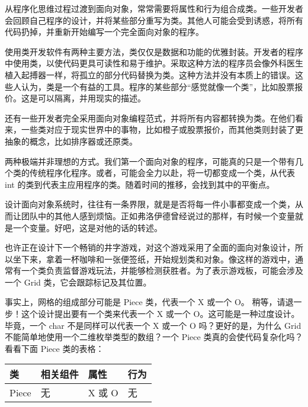 
从程序化思维过程过渡到面向对象，常常需要将属性和行为组合成类。一些开发者会回顾自己程序的设计，并将某些部分重写为类。其他人可能会受到诱惑，将所有代码扔掉，并重新开始编写一个完全面向对象的程序。

使用类开发软件有两种主要方法，类仅仅是数据和功能的优雅封装。开发者的程序中使用类，以使代码更具可读性和易于维护。采取这种方法的程序员会像外科医生植入起搏器一样，将孤立的部分代码替换为类。这种方法并没有本质上的错误。这些人认为，类是一个有益的工具。程序的某些部分“感觉就像一个类”，比如股票报价。这是可以隔离，并用现实的描述。

还有一些开发者完全采用面向对象编程范式，并将所有内容都转换为类。在他们看来，一些类对应于现实世界中的事物，比如橙子或股票报价，而其他类则封装了更抽象的概念，比如排序器或还原类。

两种极端并非理想的方式。我们第一个面向对象的程序，可能真的只是一个带有几个类的传统程序化程序。或者，可能会全力以赴，将一切都变成一个类，从代表 int 的类到代表主应用程序的类。随着时间的推移，会找到其中的平衡点。


设计面向对象系统时，往往有一条界限，就是是否将每一件小事都变成一个类，从而让团队中的其他人感到烦恼。正如弗洛伊德曾经说过的那样，有时候一个变量就是一个变量。好吧，这是对他的话的转述。

也许正在设计下一个畅销的井字游戏，对这个游戏采用了全面的面向对象设计，所以坐下来，拿着一杯咖啡和一张便签纸，开始规划类和对象。像这样的游戏中，通常有一个类负责监督游戏玩法，并能够检测获胜者。为了表示游戏板，可能会涉及一个 Grid 类，它会跟踪标记及其位置。

事实上，网格的组成部分可能是 Piece 类，代表一个 X 或一个 O。 稍等，请退一步！这个设计提出要有一个类来代表一个 X 或一个 O。这可能是一种过度设计。毕竟，一个 char 不是同样可以代表一个 X 或一个 O 吗？更好的是，为什么 Grid 不能简单地使用一个二维枚举类型的数组？一个 Piece 类真的会使代码复杂化吗？看看下面 Piece 类的表格：

\begin{longtable}{|l|l|l|l|}
\hline
\textbf{类} & \textbf{相关组件} & \textbf{属性} & \textbf{行为} \\ \hline
\endfirsthead
%
\endhead
%
Piece          & 无                           & X 或 O              & 无               \\ \hline
\end{longtable}

